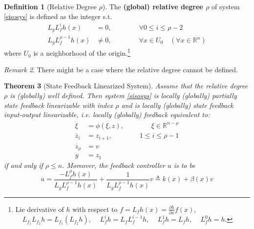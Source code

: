 \documentclass[11pt, a4paper, oneside, openany, reqno]{book}
\newtheorem{theorem}{Theorem}[chapter]
\theoremstyle{definition}
\newtheorem{definition}[theorem]{Definition}
\theoremstyle{remark}
\newtheorem{remark}[theorem]{Remark}
\numberwithin{equation}{chapter} %
\newcommand{\R}{\ensuremath{{\mathbb R}}}
\begin{document}
\begin{definition}[Relative Degree $\rho$]
	The \textbf{(global) relative degree $\rho$ }of system \eqref{sisosys} is 
	defined as the integer s.t.
	\begin{equation}\begin{split}
	L_gL_f^ih(x)&=0 , \qquad\qquad \forall  0\leq i \leq  \rho -2 \\
	L_gL_f^{\rho{}-1}h(x)&\neq0, \qquad\qquad \forall x \in U_0 \quad( \forall x \in\R^n)
	\end{split}\end{equation} 
	where $ U_0 $ is a neighborhood of the origin.\footnote{Lie derivative of $h$ 
	with respect to $f = L_f h(x)=\frac{\partial h}{\partial x} f(x)$, 
	$ \quad L_{f_1}L_{f_2}h=L_{f_1}(L_{f_2}h)$, 
	$ \quad L_f^i h=L_f L_f^{i-1} h $, $ \quad L_f^1 h = L_f h $, $ \quad L_f^0 h = h $. }
\end{definition}

\begin{remark}
	There might be a case where the relative degree cannot be defined.
\end{remark}

\begin{theorem}[State Feedback Linearized System]\label{lsysthm}
	Assume that the relative degree $ \rho $ is (globally) well defined.
	Then system \eqref{sisosys} is locally (globally) partially state feedback linearizable 
	with index $ \rho $ and is locally (globally) state feedback input-output linearizable, 
	i.e. locally (globally) feedback equivalent to:
	\begin{equation}\begin{split}\label{lform}
	\dot{\xi} &= \phi(\xi,z) , \qquad\qquad \xi \in \R^{n-\rho}\\
	\dot{z_i}&= z_{i+1} , \qquad\qquad 1 \leq i \leq \rho-1 \\
	\dot{z_\rho}&= v \\
	y &= z_1
	\end{split}\end{equation} 
	if and only if $ \rho \leq n $.
	Moreover, the feedback controller $ u $ is to be 
	\begin{equation}\label{nctrl}
	u = \frac{-L_f^\rho h(x)}{L_g L_f^{\rho-1} h(x)} + 
	\frac{1}{L_g L_f^{\rho-1} h(x)}v \triangleq k(x)+\beta(x)v
	\end{equation}
\end{theorem}
\end{document}
